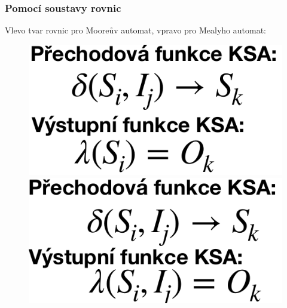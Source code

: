 \subsubsection{Pomocí soustavy rovnic}
Vlevo tvar rovnic pro Mooreův automat, vpravo pro Mealyho automat:\\
\begin{figure}[h!]
    \centering
    \begin{minipage}[b]{0.4\textwidth}
        \includegraphics[width=\textwidth]{img/MooreSoustava.png}
    \end{minipage}
    \hfill
    \begin{minipage}[b]{0.4\textwidth}
        \includegraphics[width=\textwidth]{img/MealySoustava.png}
    \end{minipage}
\end{figure}

